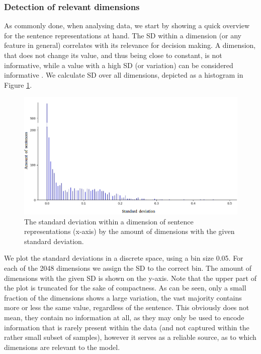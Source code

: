 \subsubsection{Detection of relevant dimensions}
As commonly done, when analysing data, we start by showing a quick overview for the sentence representations at hand. The \ac{SD} within a dimension (or any feature in general) correlates with its relevance for decision making. A dimension, that does not change its value, and thus being close to constant, is not informative, while a value with a high \ac{SD} (or variation) can be considered informative \citep{Bishop2007}. We calculate \ac{SD} over all dimensions, depicted as a histogram in Figure \ref{fig:sd}.
\begin{figure}[tph!]
\centering
	\includegraphics[totalheight=8cm]{fig/sd.png}
	\caption{The standard deviation within a dimension of sentence representations (x-axis) by the amount of dimensions with the given standard deviation.}
	\label{fig:sd}
\end{figure}
We plot the standard deviations in a discrete space, using a bin size 0.05. For each of the 2048 dimensions we assign the \ac{SD} to the correct bin. The amount of dimensions with the given \ac{SD} is shown on the y-axis. Note that the upper part of the plot is truncated for the sake of compactness. As can be seen, only a small fraction of the dimensions shows a large variation, the vast majority contains more or less the same value, regardless of the sentence. This obviously does not mean, they contain no information at all, as they may only be used to encode information that is rarely present within the data (and not captured within the rather small subset of samples), however it serves as a reliable source, as to which dimensions are relevant to the model.

